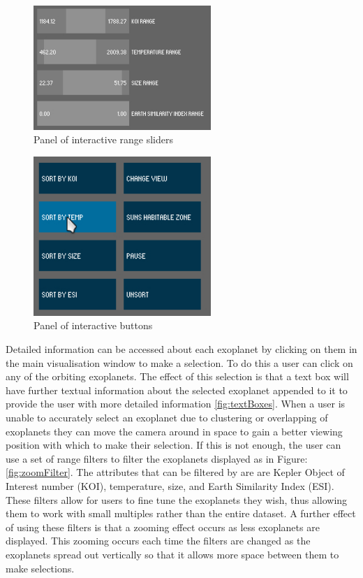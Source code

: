 \begin{figure}[H]
  \centering
      \includegraphics[width=0.6\textwidth]{images/sliders.jpg}
  \caption{Panel of interactive range sliders}
  \label{fig:sliders}
\end{figure}

\begin{figure}[H]
  \centering
      \includegraphics[width=0.6\textwidth]{images/buttons.jpg}
  \caption{Panel of interactive buttons}
  \label{fig:buttons}
\end{figure}

Detailed information can be accessed about each exoplanet by clicking on them in the main visualisation window to
make a selection. To do this a user can click on any of the orbiting exoplanets.
The effect of this selection is that a text box will have further textual
information about the selected exoplanet appended to it to provide the user with
more detailed information \ref{fig:textBoxes}. When a user is unable to accurately select an
exoplanet due to clustering or
overlapping of exoplanets they can move the camera around in space to gain a
better viewing position with which to make their selection. If this is not
enough, the user can use a set of range filters to filter the exoplanets
displayed as in Figure: \ref{fig:zoomFilter}. The attributes that can be filtered by are are Kepler Object of Interest number (KOI),
temperature, size, and Earth Similarity Index (ESI). These filters allow for
users to fine tune the exoplanets they wish, thus allowing them to work
with small multiples rather than the entire dataset. A further effect of using these filters is that a zooming effect occurs as less exoplanets are displayed. This zooming occurs each time the filters are changed as the exoplanets spread out vertically so that it allows more space between them to make selections.

